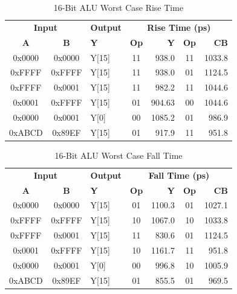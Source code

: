 \documentclass[11pt]{article}
\begin{document}
		
			\begin{table}[H]
				\centering
				\caption{16-Bit ALU Worst Case Rise Time}
				\label{tab:ALU-16-Bit-Risetime}
				\begin{tabular}{|cclcrcr|}
					\hline
					\multicolumn{2}{|c}{\textbf{Input}} & \textbf{Output} & \multicolumn{4}{c|}{\textbf{Rise Time (ps)}} \\
					\textbf{A} & \textbf{B} & \textbf{Y} & \textbf{Op} & \textbf{Y} & \textbf{Op} & \textbf{CB} \\
					\hline
					0x0000 & 0x0000 & Y{[}15{]} & 11 & 938.0 & 11 & 1033.8 \\
					0xFFFF & 0xFFFF & Y{[}15{]} & 11 & 938.0 & 01 & 1124.5 \\
					0xFFFF & 0x0001 & Y{[}15{]} & 11 & 982.2 & 11 & 1044.6 \\
					0x0001 & 0xFFFF & Y{[}15{]} & 01 & 904.63 & 00 & 1044.6 \\
					0x0000 & 0x0001 & Y{[}0{]} & 00 & 1085.2 & 01 & 986.9 \\
					0xABCD & 0x89EF & Y{[}15{]} & 01 & 917.9 & 11 & 951.8 \\
					\hline
				\end{tabular}
			\end{table}
		
		
			\begin{table}[H]
				\centering
				\caption{16-Bit ALU Worst Case Fall Time}
				\label{tab:ALU-16-Bit-Falltime}
				\begin{tabular}{|cclcrcr|}
					\hline
					\multicolumn{2}{|c}{\textbf{Input}} & \textbf{Output} & \multicolumn{4}{c|}{\textbf{Fall Time (ps)}} \\
					\textbf{A} & \textbf{B} & \textbf{Y} & \textbf{Op} & \textbf{Y} & \textbf{Op} & \textbf{CB} \\
					\hline
					0x0000 & 0x0000 & Y{[}15{]} & 01 & 1100.3 & 01 & 1027.1 \\
					0xFFFF & 0xFFFF & Y{[}15{]} & 10 & 1067.0 & 10 & 1033.8 \\
					0xFFFF & 0x0001 & Y{[}15{]} & 11 & 830.6 & 01 & 1124.5 \\
					0x0001 & 0xFFFF & Y{[}15{]} & 10 & 1161.7 & 11 & 951.8 \\
					0x0000 & 0x0001 & Y{[}0{]} & 00 & 996.8 & 10 & 1005.9 \\
					0xABCD & 0x89EF & Y{[}15{]} & 01 & 855.5 & 01 & 969.5 \\
					\hline
				\end{tabular}
			\end{table}
		
\end{document}
